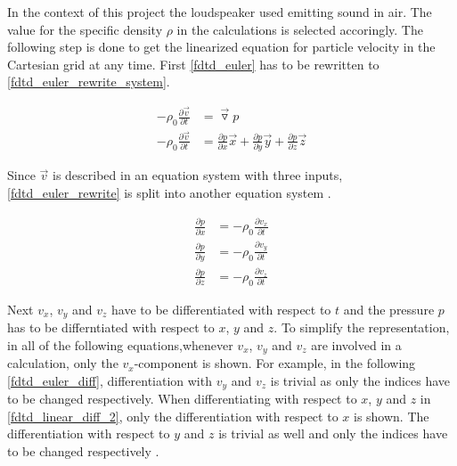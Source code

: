 In the context of this project the loudspeaker used emitting sound in air. The value for the specific density $\rho$ in the calculations is selected accoringly. The following step is done to get the linearized equation for particle velocity in the Cartesian grid at any time. First \autoref{fdtd_euler} has to be rewritten to \autoref{fdtd_euler_rewrite_system}.


\begin{subequations}\label{fdtd_euler_rewrite}
\begin{alignat}{2}
-\rho_0 \frac{\partial \vec{v}}{\partial t} &=\vec{\triangledown }p \label{fdtd_euler_rewrite_1}\\
-\rho_0 \frac{\partial \vec{v}}{\partial t} &=\frac{\partial p}{\partial x}\vec{x}+\frac{\partial p}{\partial y}\vec{y}+\frac{\partial p}{\partial z}\vec{z} \label{fdtd_euler_rewrite_2}
\end{alignat}
\end{subequations}

Since $\vec{v}$ is described in an equation system with three inputs,  \autoref{fdtd_euler_rewrite} is split into another equation system \citep{Sakuma2014}.

\begin{subequations}\label{fdtd_euler_rewrite_system}
\begin{alignat}{2}
\frac{\partial p}{\partial x} &=-\rho_0 \frac{\partial v_x}{\partial t} \label{fdtd_euler_rewrite_system_1}\\
\frac{\partial p}{\partial y} &=-\rho_0 \frac{\partial v_y}{\partial t} \label{fdtd_euler_rewrite_system_2}\\
\frac{\partial p}{\partial z} &=-\rho_0 \frac{\partial v_z}{\partial t} \label{fdtd_euler_rewrite_system_3}
\end{alignat}
\end{subequations}


Next $v_x$, $v_y$ and $v_z$ have to be differentiated with respect to $t$ and the pressure $p$ has to be differntiated with respect to $x$, $y$ and $z$. To simplify the representation, in all of the following equations,whenever $v_x$, $v_y$ and $v_z$ are involved in a calculation, only the $v_x$-component is shown. For example, in the following \autoref{fdtd_euler_diff}, differentiation with $v_y$ and $v_z$ is trivial as only the indices have to be changed respectively. When differentiating with respect to $x$, $y$ and $z$ in \autoref{fdtd_linear_diff_2}, only the differentiation with respect to $x$ is shown. The differentiation with respect to $y$ and $z$ is trivial as well and only the indices have to be changed respectively \citep{Sakuma2014}.



